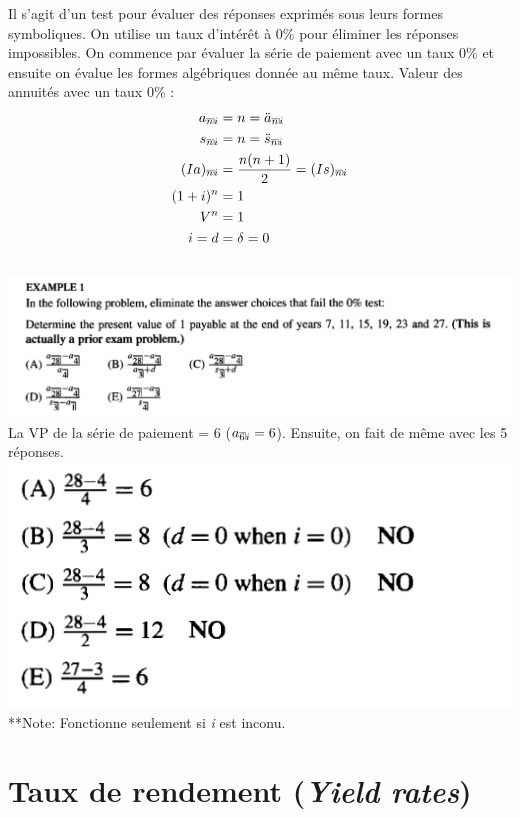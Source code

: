 \documentclass[11pt,french]{report}
\makeatletter
\DeclareRobustCommand{\annuity}[1]{%
\def\arraystretch{0}%
\setlength\arraycolsep{.7pt}%
\setlength\arrayrulewidth{.3pt}%
\begin{array}[b]{@{}c|}\hline
\\[\arraycolsep]%
\scriptstyle #1%
\end{array}%
}
\makeatother
\begin{document}
Il s'agit d'un test pour évaluer des réponses exprimés sous leurs formes symboliques. On utilise un taux d'intérêt à 0\% pour éliminer les réponses impossibles. On commence par évaluer la série de paiement avec un taux 0\% et ensuite on évalue les formes algébriques donnée au même taux. Valeur des annuités avec un taux 0\% :
\begin{align*}
a_{\annuity{n}i} & = n  = \ddot{a}_{\annuity{n}i}\\
s_{\annuity{n}i} & = n  = \ddot{s}_{\annuity{n}i}\\
(Ia)_{\annuity{n}i} & = \frac{n(n+1)}{2} = (Is)_{\annuity{n}i} \\
(1+i)^n & = 1 \\
V^n & = 1 \\
i = d & =\delta = 0\\ 
\end{align*}
\\
\includegraphics[scale=0.60]{picture11.PNG} 
La VP de la série de paiement = 6 ($a_{\annuity{6}i}  = 6$). Ensuite, on fait de même avec les 5 réponses.
\\
\includegraphics[scale=0.55]{picture12.PNG}
\\
**Note: Fonctionne seulement si \textit{i} est inconu. 



\chapter{Taux de rendement (\emph{Yield rates})}
\label{chp:yield}
\end{document}
